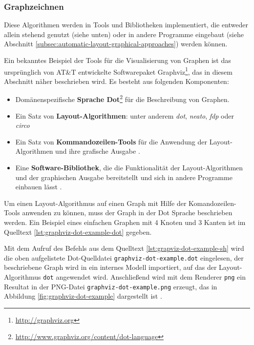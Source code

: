 \subsubsection{Graphzeichnen}

Diese Algorithmen werden in Tools und Bibliotheken implementiert, die entweder allein stehend genutzt (siehe unten) oder in andere Programme eingebaut (siehe Abschnitt \ref{subsec:automatic-layout-graphical-approaches}) werden können.

Ein bekanntes Beispiel der Tools für die Visualisierung von Graphen ist das ursprünglich von AT\&T entwickelte Softwarepaket Graphviz\footnote{\url{http://graphviz.org}}, das in diesem Abschnitt näher beschrieben wird. Es besteht aus folgenden Komponenten:

\begin{itemize}
    \item Domänenspezifische \textbf{Sprache Dot}\footnote{\url{http://www.graphviz.org/content/dot-language}} für die Beschreibung von Graphen.
    \item Ein Satz von \textbf{Layout-Algorithmen}: unter anderem \textit{dot}, \textit{neato}, \textit{fdp} oder \textit{circo} \cite{Gansner14Using, NorthGansner14Dot-Manual}
    \item Ein Satz von \textbf{Kommandozeilen-Tools} für die Anwendung der Layout-Algorithmen und ihre grafische Ausgabe \cite{NorthGansner14Dot-Manual}.
    \item Eine \textbf{Software-Bibliothek}, die die Funktionalität der Layout-Algorithmen und der graphischen Ausgabe bereitstellt und sich in andere Programme einbauen lässt \cite{Gansner14Using}.
\end{itemize}

Um einen Layout-Algorithmus auf einen Graph mit Hilfe der Komandozeilen-Tools anwenden zu können, muss der Graph in der Dot Sprache beschrieben werden. Ein Beispiel eines einfachen Graphen mit 4 Knoten und 3 Kanten ist im Quelltext \ref{lst:graphviz-dot-example-dot} gegeben.



Mit dem Aufruf des Befehls aus dem Quelltext \ref{lst:grapviz-dot-example-sh} wird die oben aufgelistete Dot-Quelldatei \lstinline{graphviz-dot-example.dot} eingelesen, der beschriebene Graph wird in ein internes Modell importiert, auf das der Layout-Algorithmus \lstinline{dot} angewendet wird. Anschließend wird mit dem Renderer \lstinline{png} ein Resultat in der PNG-Datei \lstinline{graphviz-dot-example.png} erzeugt, das in Abbildung \ref{fig:graphviz-dot-example} dargestellt ist \cite{Gansner14Using}.

